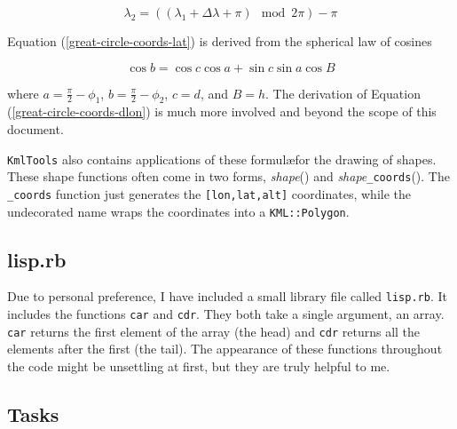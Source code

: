 \documentclass[12pt]{article}
\begin{document}
\begin{equation}
\lambda_2 = \left((\lambda_1+\Delta\lambda+\pi) \mod 2\pi\right)-\pi
\end{equation}

Equation (\ref{great-circle-coords-lat}) is derived from the spherical law of cosines

\begin{equation}
\cos{b} =\cos{c}\cos{a} + \sin c\sin a\cos B
\end{equation}

where $a=\frac{\pi}{2}-\phi_1$, $b=\frac{\pi}{2}-\phi_2$, $c=d$, and $B=h$.  The derivation of Equation (\ref{great-circle-coords-dlon}) is much more involved and beyond the scope of this document.

\texttt{KmlTools} also contains applications of these formul\ae for the drawing of shapes.  These shape functions often come in two forms, \textit{shape}() and \textit{shape}\texttt{\_coords}().  The \texttt{\_coords} function just generates the \texttt{[lon,lat,alt]} coordinates, while the undecorated name wraps the coordinates into a \texttt{KML::Polygon}.

\subsection*{lisp.rb}

Due to personal preference, I have included a small library file called \texttt{lisp.rb}.  It includes the functions \texttt{car} and \texttt{cdr}.  They both take a single argument, an array.  \texttt{car} returns the first element of the array (the head) and \texttt{cdr} returns all the elements after the first (the tail).  The appearance of these functions throughout the code might be unsettling at first, but they are truly helpful to me.

\subsection*{Tasks}
\end{document}
